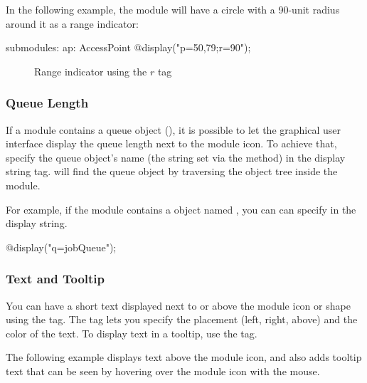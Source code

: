 In the following example, the module will have a circle with a 90-unit radius
around it as a range indicator:

\begin{ned}
submodules:
    ap: AccessPoint {
        @display("p=50,79;r=90");
    }
\end{ned}

\begin{figure}[htbp]
  \begin{center}
    \caption{Range indicator using the $r$ tag}
    \label{fig:graphics-rtag}
  \end{center}
\end{figure}

\subsubsection{Queue Length}
\label{sec:graphics:submodule-queue-length}

If a module contains a queue object (), it is possible to
let the graphical user interface display the queue length next to the
module icon. To achieve that, specify the queue object's name (the string
set via the  method) in the  display string tag.
{\opp} will find the queue object by traversing the object tree inside
the module.

For example, if the module contains a  object named
, you can can specify  in the display
string.

\begin{ned}
@display("q=jobQueue");
\end{ned}

\begin{center}
\end{center}

\subsubsection{Text and Tooltip}
\label{sec:graphics:submdule-text-and-tooltip}

You can have a short text displayed next to or above the module icon or
shape using the  tag. The tag lets you specify the placement (left,
right, above) and the color of the text. To display text in a tooltip, use
the  tag.

The following example displays text above the module icon, and also adds
tooltip text that can be seen by hovering over the module icon with the
mouse.

